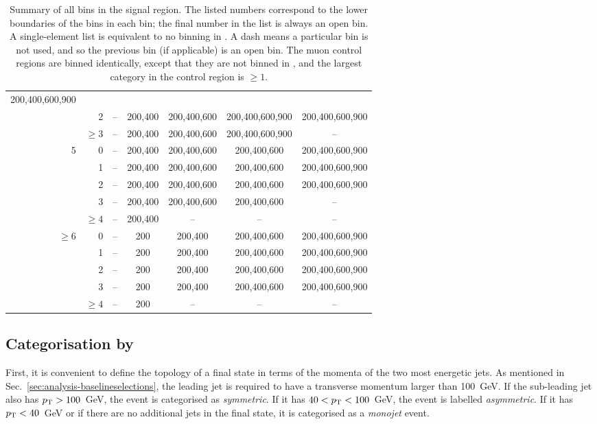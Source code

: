 \begin{table}[h!]
\begin{tabular}{r|r|ccccc}
         200,400,600,900 \\
         &      2 & -- & 200,400 & 200,400,600 & 200,400,600,900 & 
         200,400,600,900 \\
         & $\ge3$ & -- & 200,400 & 200,400,600 & 200,400,600,900 & -- \\
\hline
       5 &      0 & -- & 200,400 & 200,400,600 & 200,400,600 & 200,400,600,900 
       \\
         &      1 & -- & 200,400 & 200,400,600 & 200,400,600 & 200,400,600,900 
         \\
         &      2 & -- & 200,400 & 200,400,600 & 200,400,600 & 200,400,600,900 
         \\
         &      3 & -- & 200,400 & 200,400,600 & 200,400,600 & -- \\
         & $\ge4$ & -- & 200,400 & -- & -- & -- \\
\hline
  $\ge6$ &      0 & -- & 200       & 200,400 & 200,400,600 & 200,400,600,900 \\
         &      1 & -- & 200       & 200,400 & 200,400,600 & 200,400,600,900 \\
         &      2 & -- & 200       & 200,400 & 200,400,600 & 200,400,600,900 \\
         &      3 & -- & 200       & 200,400 & 200,400,600 & 200,400,600,900 \\
         & $\ge4$ & -- & 200       & -- & -- & -- \\
\hline
\end{tabular}
\caption{Summary of all bins in the signal region. The listed numbers 
correspond to the lower boundaries of the \mht bins in each \njnbht bin; the 
final number in the list is always an open bin. A single-element list is 
equivalent to no binning in \mht. 
A dash means a particular \njnbht bin is not used, and so the previous \scalht 
bin (if applicable) is an open bin.
The muon control regions are binned identically, except that they are not 
binned in \mht, and the largest \nb category in the 
\mmj control region is
$\ge1$.}
\end{table}

\subsection*{Categorisation by \njet}

First, it is convenient to define the topology of a final state in terms of the 
momenta of the two most energetic jets. 
As mentioned in Sec.~\ref{sec:analysis-baselineselections}, the leading jet is 
required to have a transverse momentum larger than 100~GeV. 
If the sub-leading jet also has ${p_{\text T}}>100$~GeV, the event is categorised as
\textit{symmetric}. If it has $40<{p_{\text T}}<100$~GeV, the event is labelled 
\textit{asymmetric}. If it has ${p_{\text T}}<40$~GeV or if there are no additional jets 
in the final state, it is categorised as a \textit{monojet} event. 


